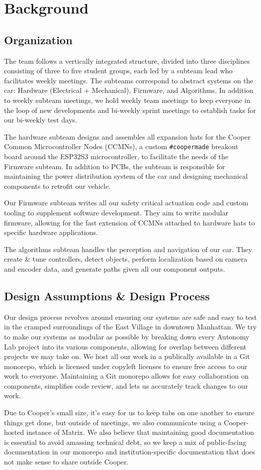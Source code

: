 \section{Background}

\subsection{Organization}

The team follows a vertically integrated structure, divided into three
disciplines consisting of three to five student groups, each led by a
subteam lead who facilitates weekly meetings. The subteams correspond
to abstract systems on the car: Hardware (Electrical + Mechanical),
Firmware, and Algorithms. In addition to weekly subteam meetings, we
hold weekly team meetings to keep everyone in the loop of new
developments and bi-weekly sprint meetings to establish tasks for our
bi-weekly test days.

The hardware subteam designs and assembles all expansion hats for the
Cooper Common Microcontroller Nodes (CCMNs), a custom
\texttt{\#coopermade} breakout board around the ESP32S3
microcontroller, to facilitate the needs of the Firmware subteam. In
addition to PCBs, the subteam is responsible for maintaining the power
distribution system of the car and designing mechanical components to
retrofit our vehicle.

Our Firmware subteam writes all our safety critical actuation code and
custom tooling to supplement software development. They aim to write
modular firmware, allowing for the fast extension of CCMNs attached to
hardware hats to specific hardware applications.

The algorithms subteam handles the perception and navigation of our
car. They create \& tune controllers, detect objects, perform
localization based on camera and encoder data, and generate paths given
all our component outputs.

\subsection{Design Assumptions \& Design Process}

Our design process revolves around ensuring our systems are safe and
easy to test in the cramped surroundings of the East Village in
downtown Manhattan. We try to make our systems as modular as possible
by breaking down every Autonomy Lab project into its various
components, allowing for overlap between different projects we may take
on. We host all our work in a publically available in a Git monorepo,
which is licensed under copyleft licenses to ensure free access to our
work to everyone. Maintaining a Git monorepo allows for easy
collaboration on components, simplifies code review, and lets us
accurately track changes to our work.

Due to Cooper's small size, it's easy for us to keep tabs on one
another to ensure things get done, but outside of meetings, we also
communicate using a Cooper-hosted instance of Matrix. We also believe
that maintaining good documentation is essential to avoid amassing
technical debt, so we keep a mix of public-facing documentation in our
monorepo and institution-specific documentation that does not make
sense to share outside Cooper.
